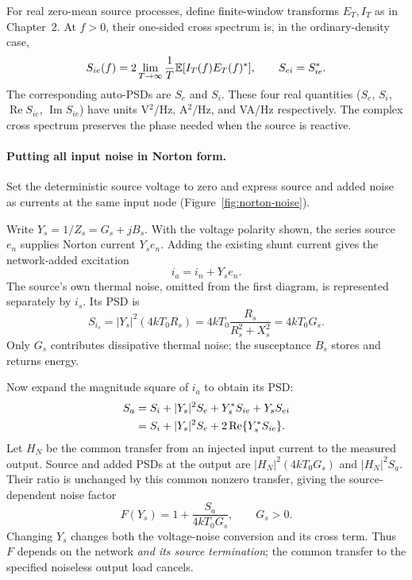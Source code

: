 \TwoPortFigure


For real zero-mean source processes, define finite-window transforms $E_T,I_T$ as in Chapter~2. At $f>0$, their one-sided cross spectrum is, in the ordinary-density case,
\[
S_{ie}(f)=2\lim_{T\to\infty}\frac1T\mathbb E[I_T(f)E_T(f)^*],\qquad S_{ei}=S_{ie}^*.
\]
The corresponding auto-PSDs are $S_e$ and $S_i$. These four real quantities ($S_e$, $S_i$, $\operatorname{Re}S_{ie}$, $\operatorname{Im}S_{ie}$) have units V$^2$/Hz, A$^2$/Hz, and VA/Hz respectively. The complex cross spectrum preserves the phase needed when the source is reactive.

\paragraph{Putting all input noise in Norton form.}
Set the deterministic source voltage to zero and express source and added noise as currents at the same input node (Figure~\ref{fig:norton-noise}).

Write $Y_s=1/Z_s=G_s+jB_s$. With the voltage polarity shown, the series source $e_n$ supplies Norton current $Y_se_n$. Adding the existing shunt current gives the network-added excitation
\[
i_a=i_n+Y_se_n.
\]
The source's own thermal noise, omitted from the first diagram, is represented separately by $i_s$. Its PSD is
\[
S_{i_s}=|Y_s|^2(4kT_0R_s)
=4kT_0\frac{R_s}{R_s^2+X_s^2}=4kT_0G_s.
\]
Only $G_s$ contributes dissipative thermal noise; the susceptance $B_s$ stores and returns energy.

\NortonNoiseFigure

Now expand the magnitude square of $i_a$ to obtain its PSD:
\begin{align}
S_a&=S_i+|Y_s|^2S_e+Y_s^*S_{ie}+Y_sS_{ei}\notag\\
&=S_i+|Y_s|^2S_e+2\operatorname{Re}\{Y_s^*S_{ie}\}.
\label{eq:added-norton}
\end{align}
Let $H_N$ be the common transfer from an injected input current to the measured output. Source and added PSDs at the output are $|H_N|^2(4kT_0G_s)$ and $|H_N|^2S_a$. Their ratio is unchanged by this common nonzero transfer, giving the source-dependent noise factor
\begin{equation}
\boxed{F(Y_s)=1+\frac{S_a}{4kT_0G_s},\qquad G_s>0.}
\label{eq:Ftwo}
\end{equation}
Changing $Y_s$ changes both the voltage-noise conversion and its cross term. Thus $F$ depends on the network \emph{and its source termination}; the common transfer to the specified noiseless output load cancels.

